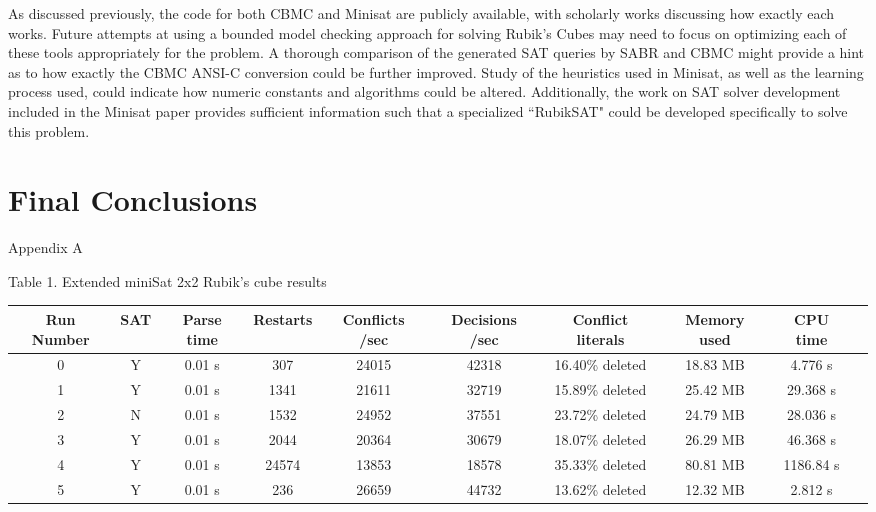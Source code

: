 \documentclass{article}
\begin{document}
\noindent As discussed previously, the code for both CBMC and Minisat are publicly available, with scholarly works discussing how exactly each works. Future attempts at using a bounded model checking approach for solving Rubik's Cubes may need to focus on optimizing each of these tools appropriately for the problem. A thorough comparison of the generated SAT queries by SABR and CBMC might provide a hint as to how exactly the CBMC ANSI-C conversion could be further improved. Study of the heuristics used in Minisat, as well as the learning process used, could indicate how numeric constants and algorithms could be altered. Additionally, the work on SAT solver development included in the Minisat paper provides 
sufficient information such that a specialized ``RubikSAT" could be developed specifically to solve this problem.

\section{Final Conclusions}


\pagebreak
\begin{center}
Appendix A
\end{center}

\begin{center}
Table 1. Extended miniSat 2x2 Rubik's cube results \\[1mm]
\end{center}
\begin{adjustwidth}{-3.5cm}{}
\begin{tabular}{|c|c|c|c|c|c|c|c|c|c|}
\hline
Run Number & SAT & Parse time & Restarts & Conflicts /sec & Decisions /sec & Conflict literals & Memory used & CPU time \\
\hline
0 & Y & 0.01 s & 307 & 24015 & 42318 & 16.40\% deleted & 18.83 MB & 4.776 s \\
\hline
1 & Y & 0.01 s & 1341 & 21611 & 32719 & 15.89\% deleted & 25.42 MB & 29.368 s \\
\hline
2 & N & 0.01 s & 1532 & 24952 & 37551 & 23.72\% deleted & 24.79 MB & 28.036 s \\
\hline
3 & Y & 0.01 s & 2044 & 20364 & 30679 & 18.07\% deleted &  26.29 MB & 46.368 s \\
\hline
4 & Y & 0.01 s & 24574 & 13853 & 18578 & 35.33\% deleted & 80.81 MB & 1186.84 s \\
\hline
5 & Y & 0.01 s & 236 & 26659 & 44732 & 13.62\% deleted & 12.32 MB & 2.812 s \\
\hline
\end{tabular} \\[3mm]
\end{adjustwidth}
\end{document}
